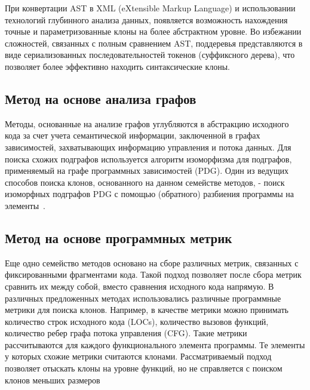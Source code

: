 При конвертации AST в XML (eXtensible Markup Language) и использовании технологий глубинного анализа данных, появляется возможность нахождения точные и параметризованные клоны на более абстрактном уровне. Во избежании сложностей, связанных с полным сравнением AST, поддеревья представляются в виде сериализованных последовательностей токенов (суффиксного дерева), что позволяет более эффективно находить синтаксические клоны.


\subsection{Метод на основе анализа графов}

Методы, основанные на анализе графов углубляются в абстракцию исходного кода за счет учета семантической информации, заключенной в графах зависимостей, захватывающих информацию управления и потока данных. Для поиска схожих подграфов используется алгоритм изоморфизма для подграфов, применяемый на графе программных зависимостей (PDG). Один из ведущих способов поиска клонов, основанного на данном семействе методов, - поиск изоморфных подграфов PDG с помощью (обратного) разбиения программы на элементы~\cite{PDGdetect}. 


\subsection{Метод на основе программных метрик}

Еще одно семейство методов основано на сборе различных метрик, связанных с фиксированными фрагментами кода. Такой подход позволяет после сбора метрик сравнить их между собой, вместо сравнения исходного кода напрямую. В различных предложенных методах использовались различные программные метрики для поиска клонов. Например, в качестве метрики можно принимать количество строк исходного кода (LOCs), количество вызовов функций, количество ребер графа потока управления (CFG). Такие метрики рассчитываются для каждого функционального элемента программы. Те элементы у которых схожие метрики считаются клонами. Рассматриваемый подход позволяет отыскать клоны на уровне функций, но не справляется с поиском клонов меньших размеров~\cite{2018art}


